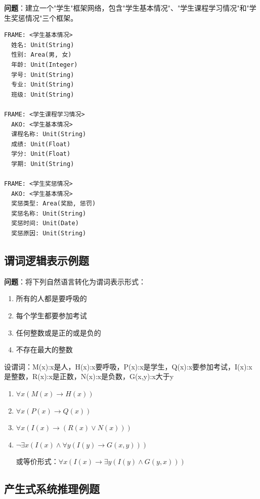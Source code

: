 \begin{examplebox}[例题2.7 框架网络表示]
\textbf{问题}：建立一个"学生"框架网络，包含"学生基本情况"、"学生课程学习情况"和"学生奖惩情况"三个框架。
\tcblower
\begin{lstlisting}
FRAME: <学生基本情况>
  姓名: Unit(String)
  性别: Area(男, 女)
  年龄: Unit(Integer)
  学号: Unit(String)
  专业: Unit(String)
  班级: Unit(String)

FRAME: <学生课程学习情况>
  AKO: <学生基本情况>
  课程名称: Unit(String)
  成绩: Unit(Float)
  学分: Unit(Float)
  学期: Unit(String)

FRAME: <学生奖惩情况>
  AKO: <学生基本情况>
  奖惩类型: Area(奖励, 惩罚)
  奖惩名称: Unit(String)
  奖惩时间: Unit(Date)
  奖惩原因: Unit(String)
\end{lstlisting}
\end{examplebox}

\subsection{谓词逻辑表示例题}

\begin{examplebox}[例题2.8 谓词公式表示]
\textbf{问题}：将下列自然语言转化为谓词表示形式：
\begin{enumerate}[itemsep=0pt]
    \item 所有的人都是要呼吸的
    \item 每个学生都要参加考试
    \item 任何整数或是正的或是负的
    \item 不存在最大的整数
\end{enumerate}
\tcblower
设谓词：M(x):x是人，H(x):x要呼吸，P(x):x是学生，Q(x):x要参加考试，I(x):x是整数，R(x):x是正数，N(x):x是负数，G(x,y):x大于y

\begin{enumerate}[itemsep=0pt]
    \item $\forall x(M(x) \to H(x))$
    \item $\forall x(P(x) \to Q(x))$
    \item $\forall x(I(x) \to (R(x) \lor N(x)))$
    \item $\neg\exists x(I(x) \land \forall y(I(y) \to G(x,y)))$
    
    或等价形式：$\forall x(I(x) \to \exists y(I(y) \land G(y,x)))$
\end{enumerate}
\end{examplebox}

\subsection{产生式系统推理例题}

